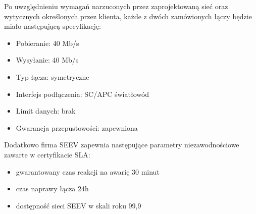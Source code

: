 \documentclass{report}
\begin{document}
Po uwzględnieniu wymagań narzuconych przez zaprojektowaną sieć oraz wytycznych określonych przez klienta, każde
z dwóch zamówionych łączy będzie miało następującą specyfikację:
\begin{itemize}
 \item Pobieranie: 40 Mb/s
\item Wysyłanie: 40 Mb/s
\item Typ łącza: symetryczne
\item Interfejs podłączenia: SC/APC światłowód
\item Limit danych: brak
\item Gwarancja przepustowości: zapewniona

\end{itemize}

Dodatkowo firma SEEV zapewnia następujące parametry niezawodnościowe zawarte w certyfikacie SLA:
\begin{itemize}
\item gwarantowany czas reakcji na awarię 30 minut
\item czas naprawy łącza 24h
\item dostępność sieci SEEV w skali roku 99,9%
\end{itemize}
\end{document}
